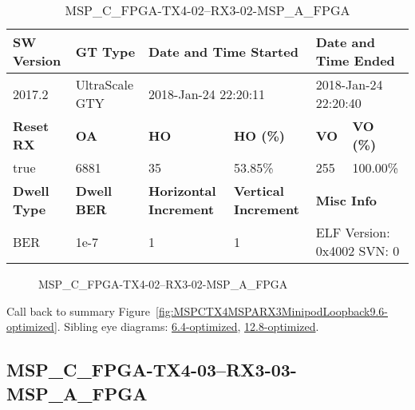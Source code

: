 \begin{table}[h]
\centering
\caption{MSP\_C\_FPGA-TX4-02--RX3-02-MSP\_A\_FPGA}
\label{tab:MSPCFPGATX402RX302MSPAFPGA9.6-optimized}
\begin{tabular}{@{}|l|l|l|l|l|l|@{}}
\toprule
\textbf{SW Version}                & \textbf{GT Type}   & \multicolumn{2}{l|}{\textbf{Date and Time Started}}            & \multicolumn{2}{l|}{\textbf{Date and Time Ended}}        \\ \midrule
2017.2                       & UltraScale GTY          & \multicolumn{2}{l|}{2018-Jan-24 22:20:11}                   & \multicolumn{2}{l|}{2018-Jan-24 22:20:40}               \\ \midrule
\textbf{Reset RX}                  & \textbf{OA} & \textbf{HO}   & \textbf{HO (\%)} & \textbf{VO} & \textbf{VO (\%)} \\ \midrule
true & 6881        & 35          & 53.85\%        & 255        & 100.00\%       \\ \midrule
\textbf{Dwell Type}                & \textbf{Dwell BER} & \textbf{Horizontal Increment} & \textbf{Vertical Increment}    & \multicolumn{2}{l|}{\textbf{Misc Info}}                  \\ \midrule
BER                            & 1e-7        & 1        & 1           & \multicolumn{2}{l|}{ELF Version: 0x4002 SVN: 0}                         \\ \bottomrule
\end{tabular}
\end{table}

\begin{figure}[h]
\caption{MSP\_C\_FPGA-TX4-02--RX3-02-MSP\_A\_FPGA} \label{fig:MSPCFPGATX402RX302MSPAFPGA9.6-optimized}
\end{figure}

Call back to summary Figure~\ref{fig:MSPCTX4MSPARX3MinipodLoopback9.6-optimized}.
Sibling eye diagrams: \hyperref[sec:MSPCFPGATX402RX302MSPAFPGA6.4-optimized]{6.4-optimized}, \hyperref[sec:MSPCFPGATX402RX302MSPAFPGA12.8-optimized]{12.8-optimized}.

\clearpage
\newpage


\subsection{MSP\_C\_FPGA-TX4-03--RX3-03-MSP\_A\_FPGA}\label{sec:MSPCFPGATX403RX303MSPAFPGA9.6-optimized}


